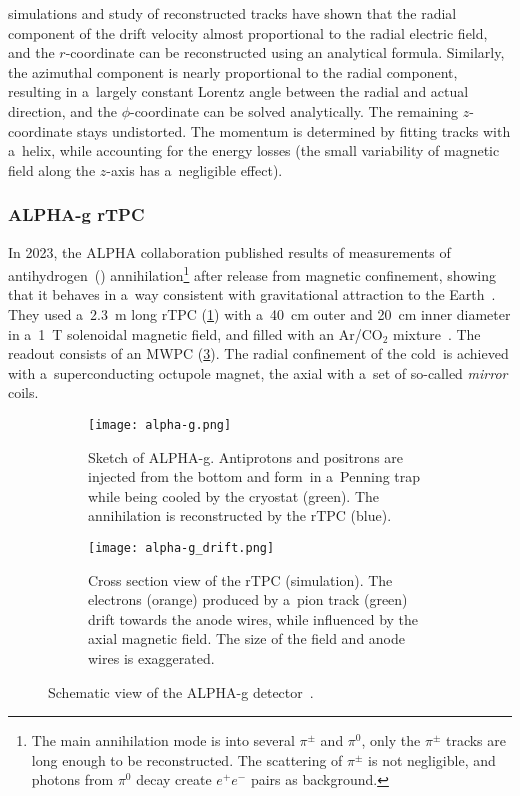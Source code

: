 				\garfieldpp simulations and study of reconstructed tracks have shown that the radial component of the drift velocity almost proportional to the radial electric field, and the $r$\nobreakdash-coordinate can be reconstructed using an analytical formula. Similarly, the azimuthal component is nearly proportional to the radial component, resulting in a~largely constant Lorentz angle between the radial and actual direction, and the $\phi$\nobreakdash-coordinate can be solved analytically. The remaining $z$\nobreakdash-coordinate stays undistorted. The momentum is determined by fitting tracks with a~helix, while accounting for the energy losses (the small variability of magnetic field along the $z$\nobreakdash-axis has a~negligible effect).
				
			\subsubsection{ALPHA-g rTPC}
				In 2023, the \acf{ALPHA} collaboration published results of measurements of antihydrogen~(\antiH) annihilation\footnote{The main \antip annihilation mode is into several $\pi^\pm$ and $\pi^0$, only the $\pi^\pm$ tracks are long enough to be reconstructed. The scattering of $\pi^\pm$ is not negligible, and photons from $\pi^0$ decay create $e^+e^-$ pairs as background.} after release from magnetic confinement, showing that it behaves in a~way consistent with gravitational attraction to the Earth~\cite{alpha_nature}. They used a~\qty{2.3}{m} long \ac{rTPC} (\cref{fig:alpha-g}) with a~\qty{40}{cm} outer and \qty{20}{cm} inner diameter in a~\qty{1}{\tesla} solenoidal magnetic field, and filled with an Ar/CO$_2$ mixture~\cite{alpha_rtpc}. The readout consists of an \ac{MWPC} (\cref{fig:alpha-g_drift}). The radial confinement of the cold~\antiH is achieved with a~superconducting octupole magnet, the axial with a~set of so\nobreakdash-called \emph{mirror} coils.
				
				\begin{figure}
					\centering
					\begin{subfigure}[t]{0.49\textwidth}
						\centering
						\texttt{[image: alpha-g.png]}
						\caption{Sketch of \acs{ALPHA}\protect\nobreakdash-g. Antiprotons and positrons are injected from the bottom and form~\antiH in a~Penning trap while being cooled by the cryostat (green). The annihilation is reconstructed by the \ac{rTPC} (blue).}
						\label{fig:alpha-g}
					\end{subfigure}
					\hfill
					\begin{subfigure}[t]{0.49\textwidth}
						\centering
						\texttt{[image: alpha-g\_drift.png]}
						\caption{Cross section view of the \ac{rTPC} (\garfieldpp simulation). The electrons (orange) produced by a~pion track (green) drift towards the anode wires, while influenced by the axial magnetic field. The size of the field and anode wires is exaggerated.}
						\label{fig:alpha-g_drift}
					\end{subfigure}
					\caption{Schematic view of the \acs{ALPHA}\protect\nobreakdash-g detector~\cite{alpha_rtpc}.}
				\end{figure}
				

